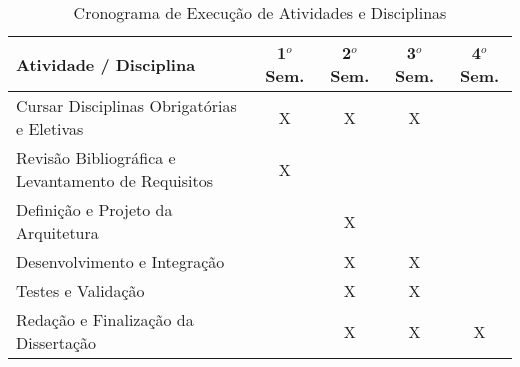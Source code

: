 \documentclass[article,12pt,a4paper]{abntex2}
\begin{document}
\begin{table}[H]
	\centering
	\label{tab:cronograma}
	\begin{tabular}{|p{6cm}|c|c|c|c|}
		\hline
		\textbf{Atividade / Disciplina} & \textbf{1$^o$ Sem.} & \textbf{2$^o$ Sem.} & \textbf{3$^o$ Sem.} & \textbf{4$^o$ Sem.} \\
		\hline
		Cursar Disciplinas Obrigatórias e Eletivas & \cellcolor{gray!20} X & \cellcolor{gray!20} X & \cellcolor{gray!20} X &  \\
		\hline
		Revisão Bibliográfica e Levantamento de Requisitos & \cellcolor{gray!20} X &  &  &  \\
		\hline
		Definição e Projeto da Arquitetura &  & \cellcolor{gray!20} X  &  &  \\
		\hline
   		Desenvolvimento e Integração &  & \cellcolor{gray!20} X & \cellcolor{gray!20} X &  \\
		\hline
		Testes e Validação &  & \cellcolor{gray!20} X & \cellcolor{gray!20} X &  \\
		\hline
		Redação e Finalização da Dissertação &  & \cellcolor{gray!20} X & \cellcolor{gray!20} X  & \cellcolor{gray!20} X  \\
		\hline
	\end{tabular}
	\caption{Cronograma de Execução de Atividades e Disciplinas}
\end{table}


\end{document}
